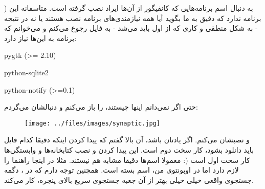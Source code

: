) به دنبال اسم برنامه‌هایی که کانفیگور از آن‌ها ایراد نصب گرفته است.
متاسفانه این برنامه 
 ندارد که دقیق به ما بگوید آیا همه نیازمندی‌های برنامه نصب هستند یا نه در نتیجه - به شکل منطقی و کاری که از اول باید می‌شد - به فایل 
 رجوع می‌کنم و می‌خوانم که برنامه به این‌ها نیاز دارد: 
\begin{frameng}
pygtk (>= 2.10)

python-sqlite2

python-notify (>=0.1)
\end{frameng}
 حتی اگر نمی‌دانم اینها چیستند، 
 را باز می‌کنم و دنبالشان می‌گردم:
\begin{figure}[H]
	\texttt{[image: ../files/images/synaptic.jpg]}
\end{figure}
و نصبشان می‌کنم. اگر یادتان باشد، آن بالا گفتم که پیدا کردن اینکه دقیقا کدام فایل باید دانلود بشود، کار سخت دوم است. این پیدا کردن و نصب کتابخانه‌ها و وابستگی‌ها کار سخت اول است (: معمولا اسم‌ها دقیقا مشابه هم نیستند. مثلا در اینجا راهنما 
 را لازم دارد اما در اوبونتوی من، اسم بسته 
 است. همچنین توجه دارم که در 
، دگمه جستجوی واقعی خیلی خیلی بهتر از آن جعبه جستجوی سریع بالای پنجره، کار می‌کند.

